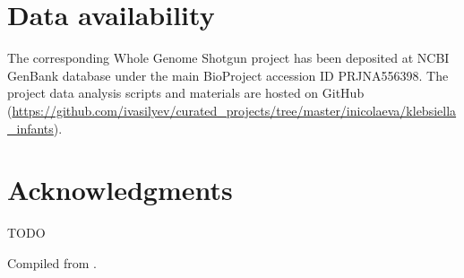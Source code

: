 \documentclass[12pt,a4paper]{article}
\begin{document}
\section{Data availability}\label{sec:data}
The corresponding Whole Genome Shotgun project has been deposited at NCBI GenBank database under the main
BioProject accession ID PRJNA556398.
The project data analysis scripts and materials are hosted on GitHub
(\url{https://github.com/ivasilyev/curated_projects/tree/master/inicolaeva/klebsiella_infants}).

\section{Acknowledgments}\label{sec:acks}
TODO

\printbibliography
Compiled from \LaTeXe{}.
\end{document}
